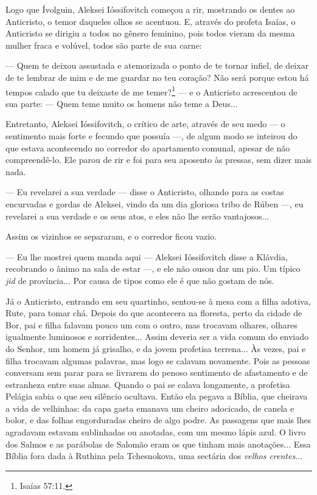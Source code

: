 Logo que Ívolguin, Aleksei Ióssifovitch começou a rir, mostrando os
dentes ao Anticristo, o temor daqueles olhos se acentuou. E, através do
profeta Isaías, o Anticristo se dirigiu a todos no gênero feminino, pois
todos vieram da mesma mulher fraca e volúvel, todos são parte de sua
carne:

--- Quem te deixou assustada e atemorizada o ponto de te tornar infiel,
de deixar de te lembrar de mim e de me guardar no teu coração? Não será
porque estou há tempos calado que tu deixaste de me temer?\footnote{Isaías
  57:11.} --- e o Anticristo acrescentou de sua parte: --- Quem teme
muito os homens não teme a Deus...

Entretanto, Aleksei Ióssifovitch, o crítico de arte, através de seu medo
--- o sentimento mais forte e fecundo que possuía ---, de algum modo se
inteirou do que estava acontecendo no corredor do apartamento comunal,
apesar de não compreendê-lo. Ele parou de rir e foi para seu aposento às
pressas, sem dizer mais nada.

--- Eu revelarei a sua verdade --- disse o Anticristo, olhando para as
costas encurvadas e gordas de Aleksei, vindo da um dia gloriosa tribo de
Rúben ---, eu revelarei a sua verdade e os seus atos, e eles não lhe
serão vantajosos...

Assim os vizinhos se separaram, e o corredor ficou vazio.

--- Eu lhe mostrei quem manda aqui --- Aleksei Ióssifovitch disse a
Klávdia, recobrando o ânimo na sala de estar ---, e ele não ousou dar um
pio. Um típico \emph{jid} de província... Por causa de tipos como ele é
que não gostam de nós.

Já o Anticristo, entrando em seu quartinho, sentou-se à mesa com a filha
adotiva, Rute, para tomar chá. Depois do que acontecera na floresta,
perto da cidade de Bor, pai e filha falavam pouco um com o outro, mas
trocavam olhares, olhares igualmente luminosos e sorridentes... Assim
deveria ser a vida comum do enviado do Senhor, um homem já grisalho, e
da jovem profetisa terrena... Às vezes, pai e filha trocavam algumas
palavras, mas logo se calavam novamente. Pois as pessoas conversam sem
parar para se livrarem do penoso sentimento de afastamento e de
estranheza entre suas almas. Quando o pai se calava longamente, a
profetisa Pelágia sabia o que seu silêncio ocultava. Então ela pegava a
Bíblia, que cheirava a vida de velhinhas: da capa gasta emanava um
cheiro adocicado, de canela e bolor, e das folhas engorduradas cheiro de
algo podre. As passagens que mais lhes agradavam estavam sublinhadas ou
anotadas, com um mesmo lápis azul. O livro dos Salmos e as parábolas de
Salomão eram os que tinham mais anotações... Essa Bíblia fora dada à
Ruthina pela Tchesnokova, uma sectária dos \emph{velhos crentes}...

